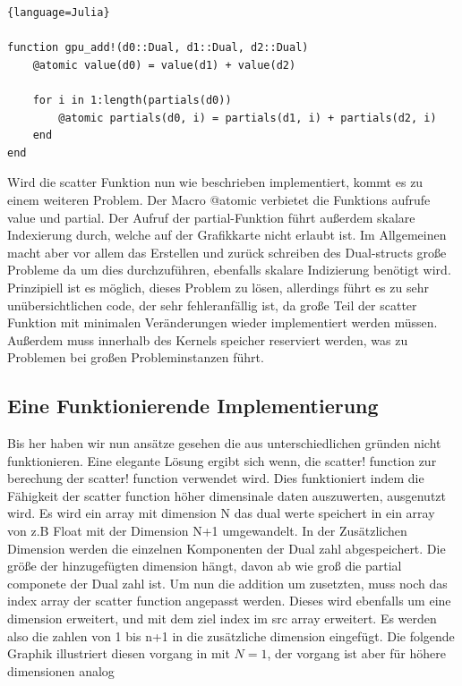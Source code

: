 \begin{lstlisting}{language=Julia}

function gpu_add!(d0::Dual, d1::Dual, d2::Dual)
	@atomic value(d0) = value(d1) + value(d2)
	
	for i in 1:length(partials(d0))
		@atomic partials(d0, i) = partials(d1, i) + partials(d2, i)
	end
end

\end{lstlisting}

Wird die scatter Funktion nun wie beschrieben implementiert, kommt es zu einem weiteren Problem.
Der Macro @atomic verbietet die Funktions aufrufe value und partial.
Der Aufruf der partial-Funktion führt außerdem skalare Indexierung durch, welche auf der Grafikkarte nicht erlaubt ist.
Im Allgemeinen macht aber vor allem das Erstellen und zurück schreiben des Dual-structs große Probleme
da um dies durchzuführen, ebenfalls skalare Indizierung benötigt wird.
Prinzipiell ist es möglich, dieses Problem zu lösen, 
allerdings führt es zu sehr unübersichtlichen code, der sehr fehleranfällig ist, 
da große Teil der scatter Funktion mit minimalen Veränderungen wieder implementiert werden müssen.
Außerdem muss innerhalb des Kernels speicher reserviert werden, was zu Problemen bei großen Probleminstanzen führt.

\subsection{Eine Funktionierende Implementierung}

Bis her haben wir nun ansätze gesehen die aus unterschiedlichen gründen nicht funktionieren.
Eine elegante Lösung ergibt sich wenn, 
die scatter! function zur berechung der scatter! function verwendet wird.
Dies funktioniert indem die Fähigkeit der scatter function höher dimensinale daten auszuwerten, ausgenutzt wird. 
Es wird ein array mit dimension N das dual werte speichert in ein array von z.B Float mit der Dimension N+1 umgewandelt. 
In der Zusätzlichen Dimension werden die einzelnen Komponenten der Dual zahl abgespeichert.
Die größe der hinzugefügten dimension hängt, davon ab wie groß die partial componete der Dual zahl ist.
Um nun die addition um zusetzten, muss noch das index array der scatter function angepasst werden.
Dieses wird ebenfalls um eine dimension erweitert, und mit dem ziel index im src array erweitert.
Es werden also die zahlen von 1 bis n+1 in die zusätzliche dimension eingefügt.
Die folgende Graphik illustriert diesen vorgang in mit $N = 1$, der vorgang ist aber für höhere dimensionen analog

